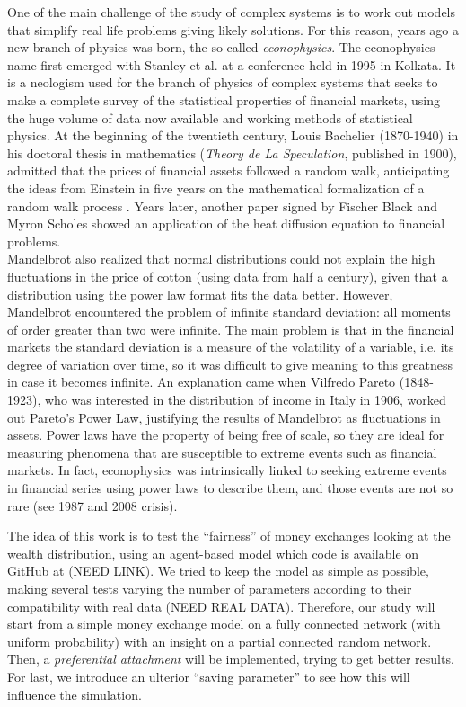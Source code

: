 One of the main challenge of the study of complex systems is to work out models that simplify real life problems giving likely solutions.
For this reason, years ago a new branch of physics was born, the so-called \emph{econophysics}.
The econophysics name first emerged with Stanley et al. at a conference held in 1995 in Kolkata.
It is a neologism used for the branch of physics of complex systems that seeks to make a complete survey of the statistical properties of financial markets, using the huge volume of data now available and working methods of statistical physics.
At the beginning of the twentieth century, Louis Bachelier (1870-1940) in his doctoral thesis in mathematics (\emph{Theory de La Speculation}, published in 1900), admitted that the prices of financial assets followed a random walk, anticipating the ideas from Einstein in five years on the mathematical formalization of a random walk process \cite{history}.
Years later, another paper signed by Fischer Black and Myron Scholes showed an application of the heat diffusion equation to financial problems. \\
Mandelbrot \cite{mandelbrot1965} also realized that normal distributions could not explain the high fluctuations in the price of cotton (using data from half a century), given that a distribution using the power law format fits the data better.  
However, Mandelbrot encountered the problem of infinite standard deviation: all moments of order greater than two were infinite.
The main problem is that in the financial markets the standard deviation is a measure of the volatility of a variable, i.e. its degree of variation over time, so it was difficult to give meaning to this greatness in case it becomes infinite.
An explanation came when Vilfredo Pareto (1848-1923), who was interested in the distribution of income in Italy in 1906, worked out Pareto's Power Law, justifying the results of Mandelbrot as fluctuations in assets.
Power laws have the property of being free of scale, so they are ideal for measuring phenomena that are susceptible to extreme events such as financial markets.
In fact, econophysics was intrinsically linked to seeking extreme events in financial series using power laws to describe them, and those events are not so rare (see 1987 and 2008 crisis).

The idea of this work is to test the ``fairness'' of money exchanges looking at the wealth distribution, using an agent-based model which code is available on GitHub at (NEED LINK).
We tried to keep the model as simple as possible, making several tests varying the number of parameters according to their compatibility with real data (NEED REAL DATA).
Therefore, our study will start from a simple money exchange model on a fully connected network (with uniform probability) with an insight on a partial connected random network.
Then, a \emph{preferential attachment} will be implemented, trying to get better results.
For last, we introduce an ulterior ``saving parameter'' to see how this will influence the simulation.